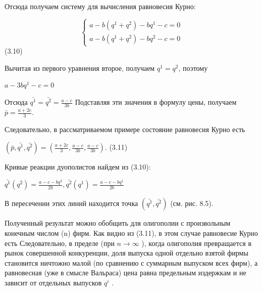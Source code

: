\documentclass[12pt, 4paper]{book}
\begin{document}
{Отсюда получаем систему для вычисления равновесия Курно:
\begin{center}
$$\left\{
\begin{aligned}
a-b(q^1+q^2)-bq^1-c=0\\
a-b(q^1+q^2)-bq^2-c=0
\end{aligned}
\right.$$ (3.10)
\end{center}
Вычитая из первого уравнения второе, получаем $q^1=q^2$, поэтому
\begin{center}
$a-3bq^1-c=0$
\end{center}
Отсюда 
$\bar{q^1}=\bar{q^2}=\frac{a-c}{3b}$
Подставляя эти значения в формулу цены, получаем $\bar{p}=\frac{a+2c}{3}.$
\par

Следовательно, в рассматриваемом примере состояние равновесия Курно есть
\begin{center}
$(\bar{p},\bar{q^1},\bar{q^2})=(\frac{a+2c}{3},\frac{a-c}{3b},\frac{a-c}{3b}).$ (3.11)
\end{center}
Кривые реакции дуополистов найдем из (3.10):
\begin{center}
$\bar{q^1}(q^2)=\frac{a-c-bq^2}{2b}, \bar{q^2}(q^1)=\frac{a-c-bq^1}{2b}$
\end{center}
\par

В пересечении этих линий находится точка $(\bar{q^1},\bar{q^2})$ (см. рис. 8.5).
\par

Полученный результат можно обобщить для олигополии с произвольным конечным числом (n) фирм. Как видно из (3.11), в этом случае равновесие Курно есть
Следовательно, в пределе (при $n \rightarrow \infty$ ), когда олигополия превращается в рынок совершенной конкуренции, доля выпуска одной отдельно взятой фирмы становится ничтожно малой (по сравнению с суммарным выпуском всех фирм), а равновесная (уже в смысле Вальраса) цена равна предельным издержкам и не зависит от отдельных выпусков $q^i$ .
\par

}
\end{document}
